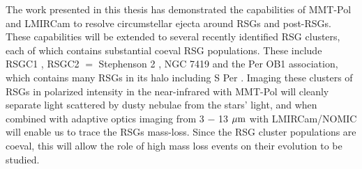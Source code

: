 The work presented in this thesis has demonstrated the capabilities of MMT-Pol and LMIRCam to resolve circumstellar ejecta around RSGs and post-RSGs.  These capabilities will be extended to several recently identified RSG clusters, each of which contains substantial coeval RSG populations.  These include RSGC1 \citep{Figer:2006,Davies:2008}, RSGC2 $=$ Stephenson 2 \citep{Davies:2007}, NGC 7419 \citep{Marco:2013} and the Per OB1 association, which contains many RSGs in its halo including S Per \citep{Humphreys:1978}.  Imaging these clusters of RSGs in polarized intensity in the near-infrared with MMT-Pol will cleanly separate light scattered by dusty nebulae from the stars' light, and when combined with adaptive optics imaging from 3 $-$ 13 $\mbox{$\mu$m}$ with LMIRCam/NOMIC will enable us to trace the RSGs mass-loss.  Since the RSG cluster populations are coeval, this will allow the role of high mass loss events on their evolution to be studied.









